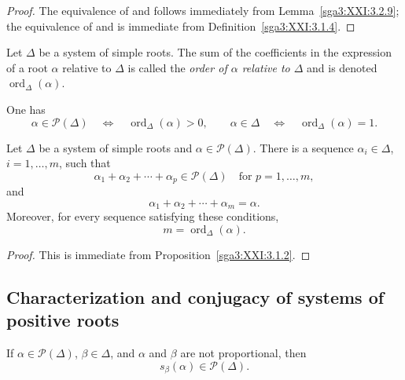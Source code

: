 \begin{proof}
The equivalence of  and  follows immediately from
Lemma~\ref{sga3:XXI:3.2.9}; the equivalence of  and  is
immediate from Definition~\ref{sga3:XXI:3.1.4}.
\end{proof}

\begin{definition}\label{sga3:XXI:3.2.15}
Let \(\Delta\) be a system of simple roots. The sum of the
coefficients in the expression of a root \(\alpha\) relative to
\(\Delta\) is called the \emph{order of \(\alpha\) relative to
\(\Delta\)} and is denoted \(\operatorname{ord}_\Delta(\alpha)\).
\end{definition}

One has
\[
 \alpha\in\mathscr{P}(\Delta)
 \quad\Longleftrightarrow\quad
 \operatorname{ord}_\Delta(\alpha)>0,
 \qquad
 \alpha\in\Delta
 \quad\Longleftrightarrow\quad
 \operatorname{ord}_\Delta(\alpha)=1.
\]

\begin{lemma}\label{sga3:XXI:3.2.16}
Let \(\Delta\) be a system of simple roots and
\(\alpha\in\mathscr{P}(\Delta)\). There is a sequence
\(\alpha_i\in\Delta\), \(i=1,\ldots,m\), such that
\[
 \alpha_1+\alpha_2+\cdots+\alpha_p\in\mathscr{P}(\Delta)
 \quad\text{for }p=1,\ldots,m,
\]
and
\[
 \alpha_1+\alpha_2+\cdots+\alpha_m=\alpha.
\]
Moreover, for every sequence satisfying these conditions,
\[
 m=\operatorname{ord}_\Delta(\alpha).
\]
\end{lemma}

\begin{proof}
This is immediate from Proposition~\ref{sga3:XXI:3.1.2}.
\end{proof}


\subsection{Characterization and conjugacy of systems of positive roots}

\begin{lemma}\label{sga3:XXI:3.3.1}
If \(\alpha\in\mathscr{P}(\Delta)\), \(\beta\in\Delta\), and
\(\alpha\) and \(\beta\) are not proportional, then
\[
 s_\beta(\alpha)\in\mathscr{P}(\Delta).
\]
\end{lemma}

